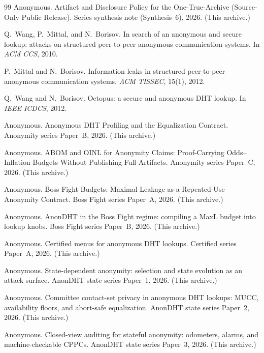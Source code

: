 \documentclass[11pt]{article}
\begin{document}
\begin{thebibliography}{99}\small
{}
Anonymous.
\newblock Artifact and Disclosure Policy for the One-True-Archive (Source-Only Public Release).
\newblock Series synthesis note (Synthesis~6), 2026. (This archive.)

Q.~Wang, P.~Mittal, and N.~Borisov.
\newblock In search of an anonymous and secure lookup: attacks on structured peer-to-peer anonymous communication systems.
\newblock In \emph{ACM CCS}, 2010.

P.~Mittal and N.~Borisov.
\newblock Information leaks in structured peer-to-peer anonymous communication systems.
\newblock \emph{ACM TISSEC}, 15(1), 2012.

Q.~Wang and N.~Borisov.
\newblock Octopus: a secure and anonymous DHT lookup.
\newblock In \emph{IEEE ICDCS}, 2012.

Anonymous.
\newblock Anonymous DHT Profiling and the Equalization Contract.
\newblock Anonymity series Paper~B, 2026. (This archive.)

Anonymous.
\newblock ABOM and OINL for Anonymity Claims: Proof-Carrying Odds--Inflation Budgets Without Publishing Full Artifacts.
\newblock Anonymity series Paper~C, 2026. (This archive.)

Anonymous.
\newblock Boss Fight Budgets: Maximal Leakage as a Repeated-Use Anonymity Contract.
\newblock Boss Fight series Paper~A, 2026. (This archive.)

Anonymous.
\newblock AnonDHT in the Boss Fight regime: compiling a MaxL budget into lookup knobs.
\newblock Boss Fight series Paper~B, 2026. (This archive.)

Anonymous.
\newblock Certified menus for anonymous DHT lookups.
\newblock Certified series Paper~A, 2026. (This archive.)

Anonymous.
\newblock State-dependent anonymity: selection and state evolution as an attack surface.
\newblock AnonDHT state series Paper~1, 2026. (This archive.)

Anonymous.
\newblock Committee contact-set privacy in anonymous DHT lookups: MUCC, availability floors, and abort-safe equalization.
\newblock AnonDHT state series Paper~2, 2026. (This archive.)

Anonymous.
\newblock Closed-view auditing for stateful anonymity: odometers, alarms, and machine-checkable CPPCs.
\newblock AnonDHT state series Paper~3, 2026. (This archive.)


\end{thebibliography}
\end{document}
